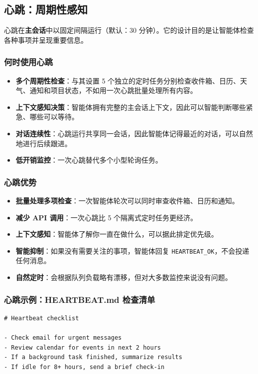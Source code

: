 \subsection{心跳：周期性感知}


心跳在\textbf{主会话}中以固定间隔运行（默认：30 分钟）。它的设计目的是让智能体检查各种事项并呈现重要信息。

\subsubsection{何时使用心跳}


\begin{itemize}
  \item \textbf{多个周期性检查}：与其设置 5 个独立的定时任务分别检查收件箱、日历、天气、通知和项目状态，不如用一次心跳批量处理所有内容。
  \item \textbf{上下文感知决策}：智能体拥有完整的主会话上下文，因此可以智能判断哪些紧急、哪些可以等待。
  \item \textbf{对话连续性}：心跳运行共享同一会话，因此智能体记得最近的对话，可以自然地进行后续跟进。
  \item \textbf{低开销监控}：一次心跳替代多个小型轮询任务。
\end{itemize}


\subsubsection{心跳优势}


\begin{itemize}
  \item \textbf{批量处理多项检查}：一次智能体轮次可以同时审查收件箱、日历和通知。
  \item \textbf{减少 API 调用}：一次心跳比 5 个隔离式定时任务更经济。
  \item \textbf{上下文感知}：智能体了解你一直在做什么，可以据此排定优先级。
  \item \textbf{智能抑制}：如果没有需要关注的事项，智能体回复 \texttt{HEARTBEAT\_OK}，不会投递任何消息。
  \item \textbf{自然定时}：会根据队列负载略有漂移，但对大多数监控来说没有问题。
\end{itemize}


\subsubsection{心跳示例：HEARTBEAT.md 检查清单}


\begin{lstlisting}
# Heartbeat checklist

- Check email for urgent messages
- Review calendar for events in next 2 hours
- If a background task finished, summarize results
- If idle for 8+ hours, send a brief check-in
\end{lstlisting}


